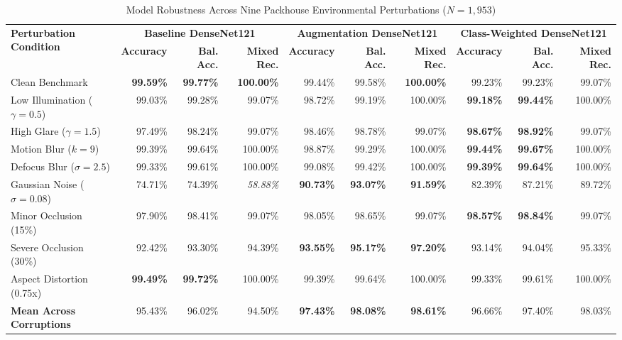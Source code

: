 \documentclass[conference]{IEEEtran}
\begin{document}
\begin{table}[!t]
\caption{Model Robustness Across Nine Packhouse Environmental Perturbations ($N=1,953$)}
\label{tab:robustness}
\centering
\begin{tabular}{lrrrrrrrrr}
\toprule
\multirow{2}{*}{\textbf{Perturbation Condition}} & \multicolumn{3}{c}{\textbf{Baseline DenseNet121}} & \multicolumn{3}{c}{\textbf{Augmentation DenseNet121}} & \multicolumn{3}{c}{\textbf{Class-Weighted DenseNet121}} \\
\cmidrule(lr){2-4} \cmidrule(lr){5-7} \cmidrule(lr){8-10}
& \textbf{Accuracy} & \textbf{Bal. Acc.} & \textbf{Mixed Rec.} & \textbf{Accuracy} & \textbf{Bal. Acc.} & \textbf{Mixed Rec.} & \textbf{Accuracy} & \textbf{Bal. Acc.} & \textbf{Mixed Rec.} \\
\midrule
Clean Benchmark & \textbf{99.59\%} & \textbf{99.77\%} & \textbf{100.00\%} & 99.44\% & 99.58\% & \textbf{100.00\%} & 99.23\% & 99.23\% & 99.07\% \\
Low Illumination ($\gamma=0.5$) & 99.03\% & 99.28\% & 99.07\% & 98.72\% & 99.19\% & 100.00\% & \textbf{99.18\%} & \textbf{99.44\%} & 100.00\% \\
High Glare ($\gamma=1.5$) & 97.49\% & 98.24\% & 99.07\% & 98.46\% & 98.78\% & 99.07\% & \textbf{98.67\%} & \textbf{98.92\%} & 99.07\% \\
Motion Blur ($k=9$) & 99.39\% & 99.64\% & 100.00\% & 98.87\% & 99.29\% & 100.00\% & \textbf{99.44\%} & \textbf{99.67\%} & 100.00\% \\
Defocus Blur ($\sigma=2.5$) & 99.33\% & 99.61\% & 100.00\% & 99.08\% & 99.42\% & 100.00\% & \textbf{99.39\%} & \textbf{99.64\%} & 100.00\% \\
Gaussian Noise ($\sigma=0.08$) & 74.71\% & 74.39\% & \textit{58.88\%} & \textbf{90.73\%} & \textbf{93.07\%} & \textbf{91.59\%} & 82.39\% & 87.21\% & 89.72\% \\
Minor Occlusion (15\%) & 97.90\% & 98.41\% & 99.07\% & 98.05\% & 98.65\% & 99.07\% & \textbf{98.57\%} & \textbf{98.84\%} & 99.07\% \\
Severe Occlusion (30\%) & 92.42\% & 93.30\% & 94.39\% & \textbf{93.55\%} & \textbf{95.17\%} & \textbf{97.20\%} & 93.14\% & 94.04\% & 95.33\% \\
Aspect Distortion (0.75x) & \textbf{99.49\%} & \textbf{99.72\%} & 100.00\% & 99.39\% & 99.64\% & 100.00\% & 99.33\% & 99.61\% & 100.00\% \\
\midrule
\textbf{Mean Across Corruptions} & 95.43\% & 96.02\% & 94.50\% & \textbf{97.43\%} & \textbf{98.08\%} & \textbf{98.61\%} & 96.66\% & 97.40\% & 98.03\% \\
\bottomrule
\end{tabular}
\end{table}
\end{document}
